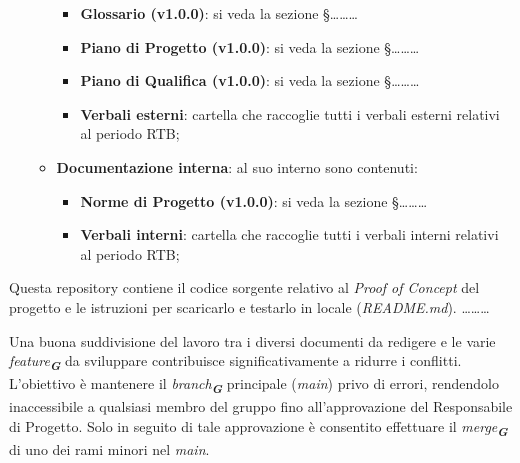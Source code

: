 \begin{itemize}
\begin{itemize}
\begin{itemize}
            \item \textbf{Glossario (v1.0.0)}: si veda la sezione \S\dots\dots\dots
            \item \textbf{Piano di Progetto (v1.0.0)}: si veda la sezione \S\dots\dots\dots
            \item \textbf{Piano di Qualifica (v1.0.0)}: si veda la sezione \S\dots\dots\dots
            \item \textbf{Verbali esterni}: cartella che raccoglie tutti i verbali esterni relativi al periodo RTB;
        \end{itemize}
        \item \textbf{Documentazione interna}: al suo interno sono contenuti:
        \begin{itemize}
            \item \textbf{Norme di Progetto (v1.0.0)}: si veda la sezione \S\dots\dots\dots
            \item \textbf{Verbali interni}: cartella che raccoglie tutti i verbali interni relativi al periodo RTB;
        \end{itemize}
    \end{itemize}
\end{itemize}

Questa repository contiene il codice sorgente relativo al \emph{Proof of Concept} del progetto e le
istruzioni per scaricarlo e testarlo in locale (\emph{README.md}). \dots\dots\dots

Una buona suddivisione del lavoro tra i diversi documenti da redigere e le varie \emph{feature}\textsubscript{\textit{\textbf{G}}}
da sviluppare contribuisce significativamente a ridurre i conflitti. L’obiettivo è mantenere 
il \emph{branch}\textsubscript{\textit{\textbf{G}}} principale (\emph{main}) privo di errori, rendendolo inaccessibile a qualsiasi membro 
del gruppo fino all’approvazione del Responsabile di Progetto. Solo in seguito di tale
approvazione è consentito effettuare il \emph{merge}\textsubscript{\textit{\textbf{G}}} di uno dei rami minori nel \emph{main}.